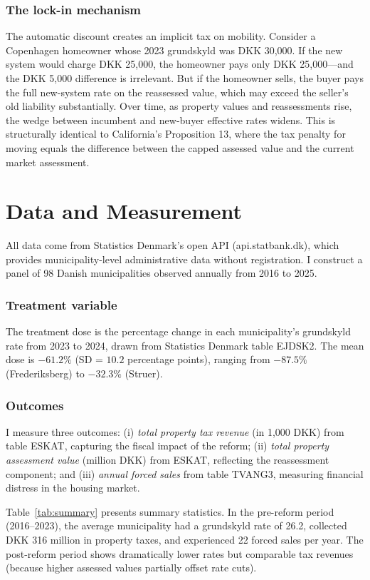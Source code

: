 \documentclass[12pt]{article}
\begin{document}
\subsubsection*{The lock-in mechanism} The automatic discount creates an implicit tax on mobility. Consider a Copenhagen homeowner whose 2023 grundskyld was DKK 30,000. If the new system would charge DKK 25,000, the homeowner pays only DKK 25,000---and the DKK 5,000 difference is irrelevant. But if the homeowner sells, the buyer pays the full new-system rate on the reassessed value, which may exceed the seller's old liability substantially. Over time, as property values and reassessments rise, the wedge between incumbent and new-buyer effective rates widens. This is structurally identical to California's Proposition 13, where the tax penalty for moving equals the difference between the capped assessed value and the current market assessment.

\section{Data and Measurement}

All data come from Statistics Denmark's open API (api.statbank.dk), which provides municipality-level administrative data without registration. I construct a panel of 98 Danish municipalities observed annually from 2016 to 2025.

\subsubsection*{Treatment variable} The treatment dose is the percentage change in each municipality's grundskyld rate from 2023 to 2024, drawn from Statistics Denmark table EJDSK2. The mean dose is $-61.2\%$ (SD = $10.2$ percentage points), ranging from $-87.5\%$ (Frederiksberg) to $-32.3\%$ (Struer).

\subsubsection*{Outcomes} I measure three outcomes: (i) \textit{total property tax revenue} (in 1,000 DKK) from table ESKAT, capturing the fiscal impact of the reform; (ii) \textit{total property assessment value} (million DKK) from ESKAT, reflecting the reassessment component; and (iii) \textit{annual forced sales} from table TVANG3, measuring financial distress in the housing market.

Table~\ref{tab:summary} presents summary statistics. In the pre-reform period (2016--2023), the average municipality had a grundskyld rate of 26.2\textperthousand{}, collected DKK 316 million in property taxes, and experienced 22 forced sales per year. The post-reform period shows dramatically lower rates but comparable tax revenues (because higher assessed values partially offset rate cuts).
\end{document}
